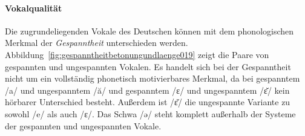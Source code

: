 \paragraph*{Vokalqualität}

Die zugrundeliegenden Vokale des Deutschen können mit dem phonologischen Merkmal der \textit{Gespanntheit} unterschieden werden.
Abbildung~\ref{fig:gespanntheitbetonungundlaenge019} zeigt die Paare von gespannten und ungespannten Vokalen.
Es handelt sich bei der Gespanntheit nicht um ein vollständig phonetisch motivierbares Merkmal, da bei gespanntem /a/ und ungespanntem /ă/ und gespanntem /ɛ/ und ungespanntem /ɛ̆/ kein hörbarer Unterschied besteht.
Außerdem ist /ɛ̆/ die ungespannte Variante zu sowohl /e/ als auch /ɛ/.
Das Schwa /ə/ steht komplett außerhalb der Systeme der gespannten und ungespannten Vokale.

